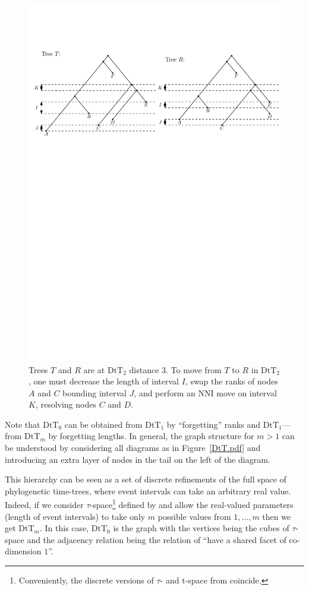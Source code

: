 \documentclass[11pt]{amsart}
\theoremstyle{definition}
\newcommand{\nni}{\mathrm{NNI}}
\newcommand{\dtt}{\mathrm{DtT}}
\begin{document}
\begin{figure}[ht]
\centering
\includegraphics[width=\textwidth]{dts_neighbors.pdf}
\caption{Trees $T$ and $R$ are at $\dtt_2$ distance $3$.
To move from $T$ to $R$ in $\dtt_2$, one must decrease the length of interval $I$, swap the ranks of nodes $A$ and $C$ bounding interval $J$, and perform an $\nni$ move on interval $K$, resolving nodes $C$ and $D$.}
\label{dts_neighbors.pdf}
\end{figure}

Note that $\dtt_0$ can be obtained from $\dtt_1$ by ``forgetting'' ranks and $\dtt_1$---from $\dtt_m$ by forgetting lengths.
In general, the graph structure for $m > 1$ can be understood by considering all diagrams as in Figure~\ref{DtT.pdf} and introducing an extra layer of nodes in the tail on the left of the diagram.

This hierarchy can be seen as a set of discrete refinements of the full space of phylogenetic time-trees, where event intervals can take an arbitrary real value.
Indeed, if we consider
$\tau$-space\footnote{Conveniently, the discrete versions of $\tau$- and $\mathrm t$-space from \autocite{Gavryushkin2014-bw} coincide.}
defined by \textcite{Gavryushkin2014-bw} and allow the real-valued parameters (length of event intervals) to take only $m$ possible values from $1,\ldots,m$ then we get $\dtt_m$.
In this case, $\dtt_0$ is the graph with the vertices being the cubes of $\tau$-space and the adjacency relation being the relation of ``have a shared facet of co-dimension $1$''.
\end{document}
